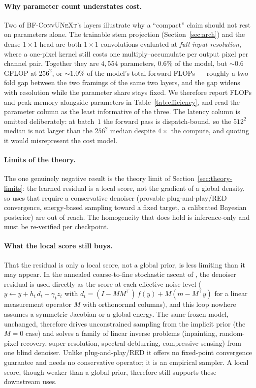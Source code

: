 \documentclass{article}
\newcommand{\model}{\textsc{BF-ConvUNeXt}}
\begin{document}
\paragraph{Why parameter count understates cost.}
Two of \model{}'s layers illustrate why a ``compact'' claim should not rest on parameters alone. The trainable stem projection (Section~\ref{sec:arch}) and the dense $1{\times}1$ head are both $1{\times}1$ convolutions evaluated at \emph{full input resolution}, where a one-pixel kernel still costs one multiply--accumulate per output pixel per channel pair. Together they are $4{,}554$ parameters, $0.6\%$ of the model, but $\sim\!0.6$\,GFLOP at $256^2$, or $\sim\!1.0\%$ of the model's total forward FLOPs --- roughly a two-fold gap between the two framings of the same two layers, and the gap widens with resolution while the parameter share stays fixed. We therefore report FLOPs and peak memory alongside parameters in Table~\ref{tab:efficiency}, and read the parameter column as the least informative of the three. The latency column is omitted deliberately: at batch~$1$ the forward pass is dispatch-bound, so the $512^2$ median is not larger than the $256^2$ median despite $4\times$ the compute, and quoting it would misrepresent the cost model.

\paragraph{Limits of the theory.}
The one genuinely negative result is the theory limit of Section~\ref{sec:theory-limits}: the learned residual is a local score, not the gradient of a global density, so uses that require a conservative denoiser (provable plug-and-play/RED convergence, energy-based sampling toward a fixed target, a calibrated Bayesian posterior) are out of reach. The homogeneity that does hold is inference-only and must be re-verified per checkpoint.

\paragraph{What the local score still buys.}
That the residual is only a local score, not a global prior, is less limiting than it may appear. In the annealed coarse-to-fine stochastic ascent of \citet{kadkhodaie2021stochastic}, the denoiser residual is used directly as the score at each effective noise level ($y \leftarrow y + h_t\,d_t + \gamma_t z_t$ with $d_t = (I - MM^\top)\,f(y) + M(m - M^\top y)$ for a linear measurement operator $M$ with orthonormal columns), and this loop nowhere assumes a symmetric Jacobian or a global energy. The same frozen model, unchanged, therefore drives unconstrained sampling from the implicit prior (the $M{=}0$ case) and solves a family of linear inverse problems (inpainting, random-pixel recovery, super-resolution, spectral deblurring, compressive sensing) from one blind denoiser. Unlike plug-and-play/RED it offers no fixed-point convergence guarantee and needs no conservative operator; it is an empirical sampler. A local score, though weaker than a global prior, therefore still supports these downstream uses.
\end{document}
